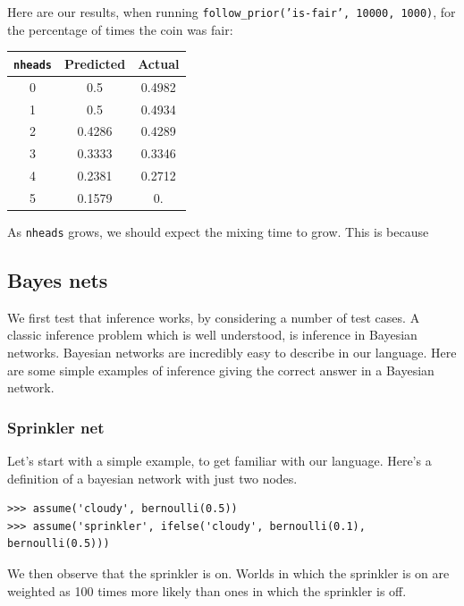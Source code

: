 \documentclass[11pt]{article}
\begin{document}
Here are our results, when running {\tt follow\_prior('is-fair', 10000, 1000)}, for the percentage of times the coin was fair:  

\begin{center}
\begin{tabular}{|c | c| c |} \hline
{\tt nheads} & Predicted & Actual \\ \hline
0 & 0.5 & 0.4982\\ \hline
1 & 0.5 & 0.4934 \\ \hline
2 & 0.4286 &  0.4289 \\ \hline
3 & 0.3333 &  0.3346 \\ \hline
4 & 0.2381 &  0.2712 \\ \hline
5 & 0.1579 &  0. \\ \hline
\end{tabular}
\end{center}

As {\tt nheads} grows, we should expect the mixing time to grow.  This is because 
\subsection{Bayes nets}

We first test that inference works, by considering a number of test cases.  A classic inference problem which is well understood, is inference in Bayesian networks.  Bayesian networks are incredibly easy to describe in our language.  Here are some simple examples of inference giving the correct answer in a Bayesian network.

\subsubsection{Sprinkler net}

Let's start with a simple example, to get familiar with our language.   Here's a definition of a bayesian network with just two nodes.

\begin{small}
\begin{verbatim}
>>> assume('cloudy', bernoulli(0.5))
>>> assume('sprinkler', ifelse('cloudy', bernoulli(0.1), bernoulli(0.5)))
\end{verbatim}
\end{small}

\noindent We then observe that the sprinkler is on.  Worlds in which the sprinkler is on are weighted as 100 times more likely than ones in which the sprinkler is off.  
\end{document}
